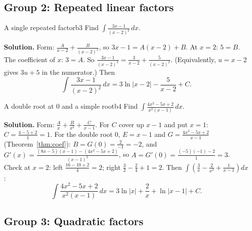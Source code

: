 \documentclass[11pt]{article}
\begin{document}
\subsection*{Group 2: Repeated linear factors}

\begin{exmp}{A single repeated factor}{b3}
Find $\displaystyle\int\frac{3x-1}{(x-2)^2}\,dx$.

\textbf{Solution.} Form: $\frac A{x-2}+\frac B{(x-2)^2}$, so $3x-1=A(x-2)+B$. At $x=2$: $5=B$. The coefficient of $x$: $3=A$. So $\frac{3x-1}{(x-2)^2}=\frac3{x-2}+\frac5{(x-2)^2}$. (Equivalently, $u=x-2$ gives $3u+5$ in the numerator.) Then
\[\int\frac{3x-1}{(x-2)^2}\,dx=3\ln\lvert x-2\rvert-\frac5{x-2}+C .\]
\end{exmp}

\begin{exmp}{A double root at $0$ and a simple root}{b4}
Find $\displaystyle\int\frac{4x^2-5x+2}{x^2(x-1)}\,dx$.

\textbf{Solution.} Form: $\frac Ax+\frac B{x^2}+\frac C{x-1}$. For $C$ cover up $x-1$ and put $x=1$: $C=\frac{4-5+2}{1}=1$. For the double root $0$, $E=x-1$ and $G=\frac{4x^2-5x+2}{x-1}$ (Theorem~\ref{thm:coef}): $B=G(0)=\frac2{-1}=-2$, and $G'(x)=\frac{(8x-5)(x-1)-(4x^2-5x+2)}{(x-1)^2}$, so $A=G'(0)=\frac{(-5)(-1)-2}{1}=3$. Check at $x=2$: left $\frac{16-10+2}{4}=2$; right $\frac32-\frac24+1=2$. Then $\int\left(\frac3x-\frac2{x^2}+\frac1{x-1}\right)dx$:
\[\int\frac{4x^2-5x+2}{x^2(x-1)}\,dx=3\ln\lvert x\rvert+\frac2x+\ln\lvert x-1\rvert+C .\]
\end{exmp}

\subsection*{Group 3: Quadratic factors}
\end{document}
